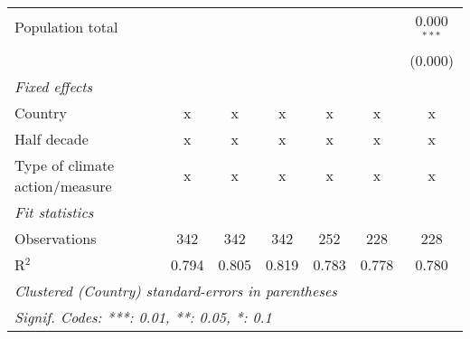 \begin{tabular}{lcccccc}
   Population total                                                        &         &                &                &                &                & 0.000$^{***}$\\   
                                                                           &         &                &                &                &                & (0.000)\\   
   \emph{Fixed effects}\\
   Country                                                                 & x       & x              & x              & x              & x              & x\\  
   Half decade                                                             & x       & x              & x              & x              & x              & x\\  
   Type of climate action/measure                                          & x       & x              & x              & x              & x              & x\\  
   \midrule \emph{Fit statistics}\\
   Observations                                                            & 342     & 342            & 342            & 252            & 228            & 228\\  
   R$^2$                                                                   & 0.794   & 0.805          & 0.819          & 0.783          & 0.778          & 0.780\\  
   \midrule
   \multicolumn{7}{l}{\emph{Clustered (Country) standard-errors in parentheses}}\\
   \multicolumn{7}{l}{\emph{Signif. Codes: ***: 0.01, **: 0.05, *: 0.1}}\\
\end{tabular}
\par\endgroup


